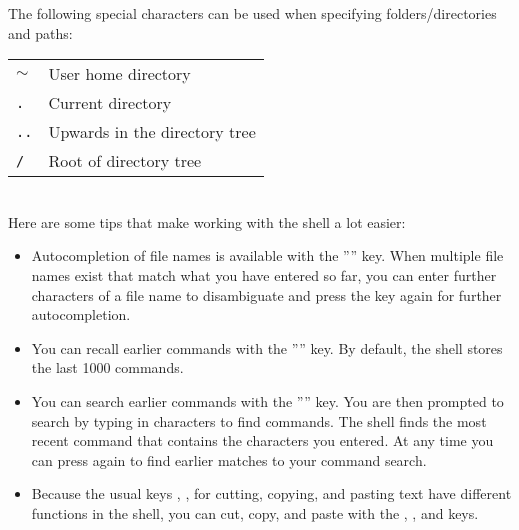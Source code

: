 
\noindent The following special characters can be used when specifying folders/directories and paths:\\

\begin{tabular}{l|l} \hline
\texttt{$\sim$} & User home directory \\
\texttt{.} & Current directory \\
\texttt{..} & Upwards in the directory tree \\
\texttt{/} & Root of directory tree \\ \hline
\end{tabular} \\

\noindent Here are some tips that make working with the shell a lot easier:

\begin{itemize}
  \item Autocompletion of file names is available with the '''' key. When multiple file names exist that match what you have entered so far, you can enter further characters of a file name to disambiguate and press the  key again for further autocompletion. 
  \item You can recall earlier commands with the '''' key. By default, the shell stores the last 1000 commands.
  \item You can search earlier commands with the '''' key. You are then prompted to search by typing in characters to find commands. The shell finds the most recent command that contains the  characters you entered. At any time you can press  again to find earlier matches to your command search. 
  \item Because the usual keys , ,  for cutting, copying, and pasting text have different functions in the shell, you can cut, copy, and paste with the , , and  keys.
\end{itemize}

